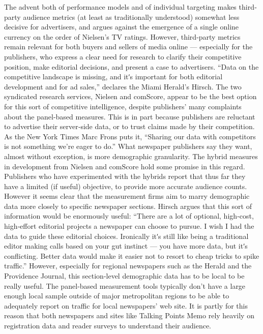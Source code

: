 The advent both of performance models and of individual targeting
makes third‐party audience metrics (at least as traditionally understood)
somewhat less decisive for advertisers, and argues against the emergence
of a single online currency on the order of Nielsen’s TV ratings.
However, third‐party metrics remain relevant for both buyers and sellers
of media online — especially for the publishers, who express a clear need
for research to clarify their competitive position, make editorial decisions,
and present a case to advertisers. ``Data on the competitive landscape is
missing, and itʹs important for both editorial development and for ad
sales,'' declares the Miami Herald’s Hirsch.
The two syndicated research services, Nielsen and comScore, appear to be
the best option for this sort of competitive intelligence, despite publishers’
many complaints about the panel‐based measures. This is in part because
publishers are reluctant to advertise their server‐side data, or to trust
claims made by their competition. As the New York Times Marc Frons puts
it, ``Sharing our data with competitors is not something we’re eager to
do.''
What newspaper publishers say they want, almost without exception, is
more demographic granularity. The hybrid measures in development
from Nielsen and comScore hold some promise in this regard. Publishers
who have experimented with the hybrids report that thus far they have a
limited (if useful) objective, to provide more accurate audience counts.
However it seems clear that the measurement firms aim to marry
demographic data more closely to specific newspaper sections. Hirsch
argues that this sort of information would be enormously useful:
``There are a lot of optional, high‐cost, high‐effort editorial projects
a newspaper can choose to pursue. I wish I had the data to guide
these editorial choices. Ironically itʹs still like being a traditional
editor making calls based on your gut instinct — you have more
data, but itʹs conflicting. Better data would make it easier not to
resort to cheap tricks to spike traffic.''
However, especially for regional newspapers such as the Herald and the
Providence Journal, this section‐level demographic data has to be local to be
really useful. The panel‐based measurement tools typically don’t have a
large enough local sample outside of major metropolitan regions to be
able to adequately report on traffic for local newspapers’ web site. It is
partly for this reason that both newspapers and sites like Talking Points
Memo rely heavily on registration data and reader surveys to understand
their audience.
